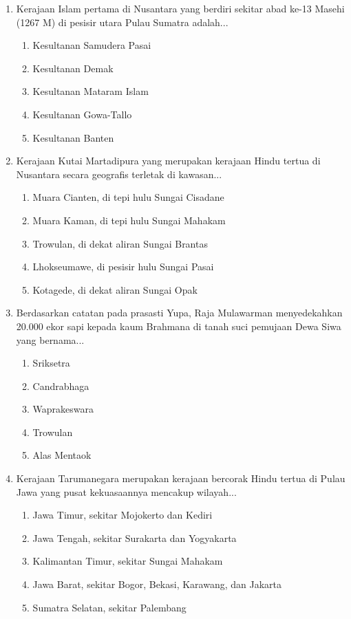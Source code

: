 \documentclass[12pt, a4paper]{article}
\begin{document}
\begin{enumerate}[label=\arabic*.]
    \item Kerajaan Islam pertama di Nusantara yang berdiri sekitar abad ke-13 Masehi (1267 M) di pesisir utara Pulau Sumatra adalah...
    \begin{enumerate}[label=\Alph*.]
        \item Kesultanan Samudera Pasai
        \item Kesultanan Demak
        \item Kesultanan Mataram Islam
        \item Kesultanan Gowa-Tallo
        \item Kesultanan Banten
    \end{enumerate}
\item Kerajaan Kutai Martadipura yang merupakan kerajaan Hindu tertua di Nusantara secara geografis terletak di kawasan...
    \begin{enumerate}[label=\Alph*.]
        \item Muara Cianten, di tepi hulu Sungai Cisadane
        \item Muara Kaman, di tepi hulu Sungai Mahakam
        \item Trowulan, di dekat aliran Sungai Brantas
        \item Lhokseumawe, di pesisir hulu Sungai Pasai
        \item Kotagede, di dekat aliran Sungai Opak
    \end{enumerate}

    \item Berdasarkan catatan pada prasasti Yupa, Raja Mulawarman menyedekahkan 20.000 ekor sapi kepada kaum Brahmana di tanah suci pemujaan Dewa Siwa yang bernama...
    \begin{enumerate}[label=\Alph*.]
        \item Sriksetra
        \item Candrabhaga
        \item Waprakeswara
        \item Trowulan
        \item Alas Mentaok
    \end{enumerate}

    \item Kerajaan Tarumanegara merupakan kerajaan bercorak Hindu tertua di Pulau Jawa yang pusat kekuasaannya mencakup wilayah...
    \begin{enumerate}[label=\Alph*.]
        \item Jawa Timur, sekitar Mojokerto dan Kediri
        \item Jawa Tengah, sekitar Surakarta dan Yogyakarta
        \item Kalimantan Timur, sekitar Sungai Mahakam
        \item Jawa Barat, sekitar Bogor, Bekasi, Karawang, dan Jakarta
        \item Sumatra Selatan, sekitar Palembang
    \end{enumerate}


\end{enumerate}
\end{document}

